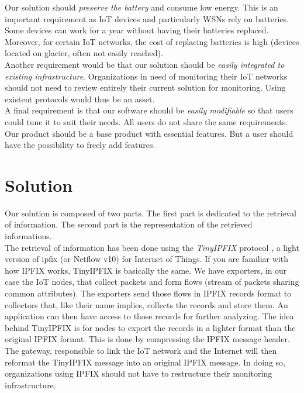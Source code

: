Our solution should \textit{preserve the battery} and consume low energy. This is an important requirement as IoT devices and particularly WSNs rely on batteries. Some devices can work for a year without having their batteries replaced. Moreover, for certain IoT networks, the cost of replacing batteries is high (devices located on glacier, often not easily reached).\\

Another requirement would be that our solution should be \textit{easily integrated to existing infrastructure}. Organizations in need of monitoring their IoT networks should not need to review entirely their current solution for monitoring. Using existent protocols would thus be an asset. \\

A final requirement is that our software should be \textit{easily modifiable} so that users could tune it to suit their needs. All users do not share the same requirements. Our product should be a base product with essential features. But a user should have the possibility to freely add features.

\section*{Solution}

Our solution is composed of two parts. The first part is dedicated to the retrieval of information. The second part is the representation of the retrieved informations. \\

The retrieval of information has been done using the \textit{TinyIPFIX} protocol \cite{schmitt2016tinyipfix}, a light version of \acrshort{ipfix} (or Netflow v10) for Internet of Things. If you are familiar with how IPFIX works, TinyIPFIX is basically the same. We have exporters, in our case the IoT nodes, that collect packets and form flows (stream of packets sharing common attributes). The exporters send those flows in IPFIX records format to collectors that, like their name implies, collects the records and store them. An application can then have access to those records for further analyzing. The idea behind TinyIPFIX is for nodes to export the records in a lighter format than the original IPFIX format. This is done by compressing the IPFIX message header. The gateway, responsible to link the IoT network and the Internet will then reformat the TinyIPFIX message into an original IPFIX message. In doing so, organizations using IPFIX should not have to restructure their monitoring infrastructure. \\

